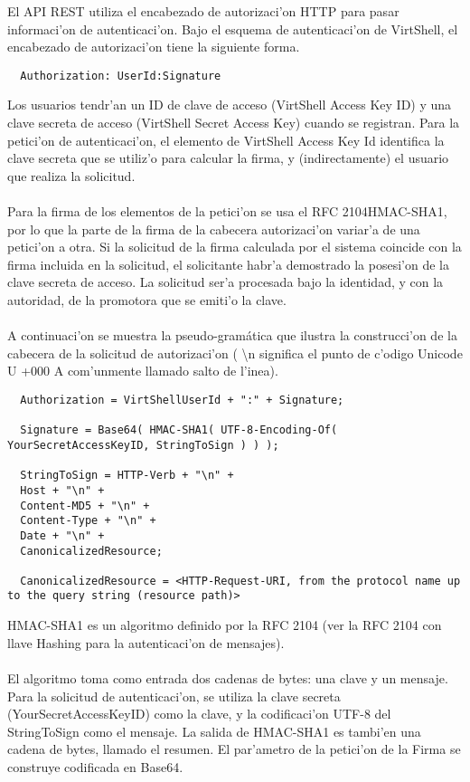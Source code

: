 El API REST utiliza el encabezado de autorizaci'on HTTP para pasar informaci'on de autenticaci'on. Bajo el esquema de autenticaci'on de VirtShell, el encabezado de autorizaci'on tiene la siguiente forma.

\medskip
\begin{lstlisting}
  Authorization: UserId:Signature
\end{lstlisting}
\medskip

Los usuarios tendr'an un ID de clave de acceso (VirtShell Access Key ID) y una clave secreta de acceso (VirtShell Secret Access Key) cuando se registran. Para la petici'on de autenticaci'on, el elemento de VirtShell Access Key Id identifica la clave secreta que se utiliz'o para calcular la firma, y (indirectamente) el usuario que realiza la solicitud.\\
\\
Para la firma de los elementos de la petici'on se usa el RFC 2104HMAC-SHA1, por lo que la parte de la firma de la cabecera autorizaci'on variar'a de una petici'on a otra. Si la solicitud de la firma calculada por el sistema coincide con la firma incluida en la solicitud, el solicitante habr'a demostrado la posesi'on de la clave secreta de acceso. La solicitud ser'a procesada bajo la identidad, y con la autoridad, de la promotora que se emiti'o la clave.\\
\\
A continuaci'on se muestra la pseudo-gramática que ilustra la construcci'on de la cabecera de la solicitud de autorizaci'on (
\textbackslash{}n significa el punto de c'odigo Unicode U +000 A com'unmente llamado salto de l'inea).

\medskip
\begin{lstlisting}
  Authorization = VirtShellUserId + ":" + Signature;

  Signature = Base64( HMAC-SHA1( UTF-8-Encoding-Of( YourSecretAccessKeyID, StringToSign ) ) );

  StringToSign = HTTP-Verb + "\n" +
  Host + "\n" +
  Content-MD5 + "\n" +
  Content-Type + "\n" +
  Date + "\n" +
  CanonicalizedResource;

  CanonicalizedResource = <HTTP-Request-URI, from the protocol name up to the query string (resource path)>
\end{lstlisting}

HMAC-SHA1 es un algoritmo definido por la RFC 2104 (ver la RFC 2104 con llave Hashing para la autenticaci'on de mensajes).\\
\\
El algoritmo toma como entrada dos cadenas de bytes: una clave y un mensaje. Para la solicitud de autenticaci'on, se utiliza la clave secreta (YourSecretAccessKeyID) como la clave, y la codificaci'on UTF-8 del StringToSign como el mensaje. La salida de HMAC-SHA1 es tambi'en una cadena de bytes, llamado el resumen. El par'ametro de la petici'on de la Firma se construye codificada en Base64.

